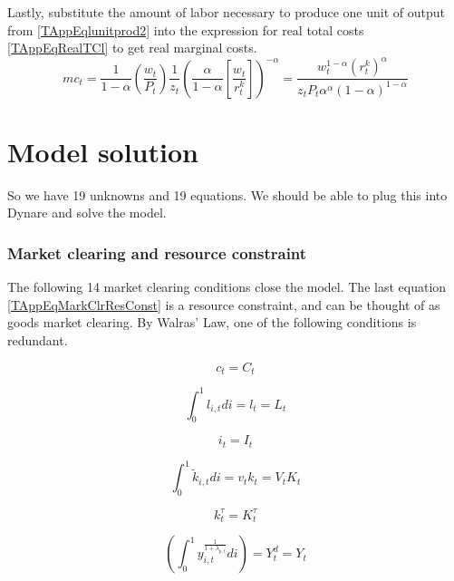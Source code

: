 Lastly, substitute the amount of labor necessary to produce one unit of output from \eqref{TAppEqlunitprod2} into the expression for real total costs \eqref{TAppEqRealTCl} to get real marginal costs.
\begin{equation}\label{TAppEqRealMC}
   mc_t = \frac{1}{1-\alpha}\left(\frac{w_t}{P_t}\right)\frac{1}{z_t}\left(\frac{\alpha}{1-\alpha}\left[\frac{w_t}{r_t^k}\right]\right)^{-\alpha} = \frac{w_t^{1-\alpha}(r_t^k)^\alpha}{z_t P_t \alpha^\alpha (1-\alpha)^{1-\alpha}}
\end{equation}


\section{Model solution}\label{TAppModelSol}

So we have 19 unknowns and 19 equations.  We should be able to plug this into Dynare and solve the model.

\subsubsection{Market clearing and resource constraint}
\label{TAppSecMCandRC}

The following 14 market clearing conditions close the model. The last equation \eqref{TAppEqMarkClrResConst} is a resource constraint, and can be thought of as goods market clearing. By Walras' Law, one of the following conditions is redundant.

\begin{equation}\label{TAppEqMarkClrC}
   c_t = C_t
\end{equation}

\begin{equation}\label{TAppEqMarkClrL}
   \int_{0}^{1}l_{i,t}di = l_t = L_t
\end{equation}

\begin{equation}\label{TAppEqMarkClrI}
   i_t = I_t
\end{equation}

\begin{equation}\label{TAppEqMarkClrK}
   \int_{0}^{1}\tilde{k}_{i,t}di = v_{t}k_{t} = V_{t}K_{t}
\end{equation}

\begin{equation}\label{TAppEqMarkClrKtau}
   k_t^\tau = K_t^\tau
\end{equation}

\begin{equation}\label{TAppEqMarkClry}
   \left(\int_{0}^{1}y_{i,t}^{\frac{1}{1+\lambda_{p,t}}} di \right) = Y_{t}^{d} = Y_{t}
\end{equation}

